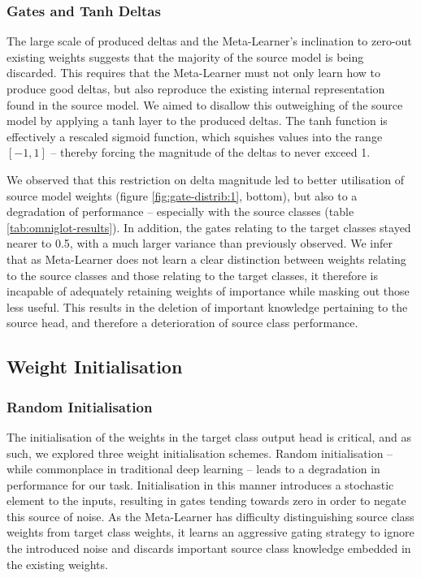 \documentclass{report}
\begin{document}
\subsubsection{Gates and Tanh Deltas}
The large scale of produced deltas and the Meta-Learner's inclination to zero-out existing weights suggests that the majority of the source model is being discarded. This requires that the Meta-Learner must not only learn how to produce good deltas, but also reproduce the existing internal representation found in the source model. We aimed to disallow this outweighing of the source model by applying a tanh layer to the produced deltas. The tanh function is effectively a rescaled sigmoid function, which squishes values into the range $[-1, 1]$ -- thereby forcing the magnitude of the deltas to never exceed 1. \par
We observed that this restriction on delta magnitude led to better utilisation of source model weights (figure \ref{fig:gate-distrib:1}, bottom), but also to a degradation of performance -- especially with the source classes (table \ref{tab:omniglot-results}). In addition, the gates relating to the target classes stayed nearer to 0.5, with a much larger variance than previously observed. We infer that as Meta-Learner does not learn a clear distinction between weights relating to the source classes and those relating to the target classes, it therefore is incapable of adequately retaining weights of importance while masking out those less useful. This results in the deletion of important knowledge pertaining to the source head, and therefore a deterioration of source class performance.

\subsection{Weight Initialisation}
\subsubsection{Random Initialisation}
The initialisation of the weights in the target class output head is critical, and as such, we explored three weight initialisation schemes. Random initialisation -- while commonplace in traditional deep learning -- leads to a degradation in performance for our task. Initialisation in this manner introduces a stochastic element to the inputs, resulting in gates tending towards zero in order to negate this source of noise. As the Meta-Learner has difficulty distinguishing source class weights from target class weights, it learns an aggressive gating strategy to ignore the introduced noise and discards important source class knowledge embedded in the existing weights.
\end{document}
